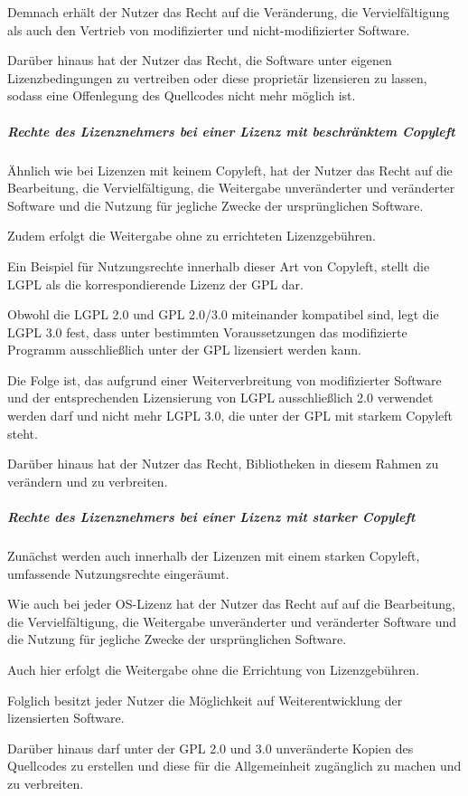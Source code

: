 Demnach erhält der Nutzer das Recht auf die Veränderung, die Vervielfältigung als auch den Vertrieb von modifizierter und nicht-modifizierter Software. 

Darüber hinaus hat der Nutzer das Recht, die Software unter eigenen Lizenzbedingungen zu vertreiben oder diese proprietär lizensieren zu lassen, sodass eine Offenlegung des Quellcodes nicht mehr möglich ist.

\subparagraph{Rechte des Lizenznehmers bei einer Lizenz mit beschränktem Copyleft}
Ähnlich wie bei Lizenzen mit keinem Copyleft, hat der Nutzer das Recht auf die Bearbeitung, die Vervielfältigung, die Weitergabe unveränderter und veränderter Software und die Nutzung für jegliche Zwecke der ursprünglichen Software. 

Zudem erfolgt die Weitergabe ohne zu errichteten Lizenzgebühren.

Ein Beispiel für Nutzungsrechte innerhalb dieser Art von Copyleft, stellt die LGPL als die korrespondierende Lizenz der GPL dar. 

Obwohl die LGPL 2.0 und GPL 2.0/3.0 miteinander kompatibel sind, legt die LGPL 3.0 fest, dass unter bestimmten Voraussetzungen das modifizierte Programm ausschließlich unter der GPL lizensiert werden kann.

Die Folge ist, das aufgrund einer Weiterverbreitung von modifizierter Software und der entsprechenden Lizensierung von LGPL ausschließlich 2.0 verwendet werden darf und nicht mehr LGPL 3.0, die unter der GPL mit starkem Copyleft steht.

Darüber hinaus hat der Nutzer das Recht, Bibliotheken in diesem Rahmen zu verändern und zu verbreiten. 

\subparagraph{Rechte des Lizenznehmers bei einer Lizenz mit starker Copyleft}
Zunächst werden auch innerhalb der Lizenzen mit einem starken Copyleft, umfassende Nutzungsrechte eingeräumt. 

Wie auch bei jeder OS-Lizenz hat der Nutzer das Recht auf auf die Bearbeitung, die Vervielfältigung, die Weitergabe unveränderter und veränderter Software und die Nutzung für jegliche Zwecke der ursprünglichen Software.

Auch hier erfolgt die Weitergabe ohne die Errichtung von Lizenzgebühren.

Folglich besitzt jeder Nutzer die Möglichkeit auf Weiterentwicklung der lizensierten Software.  

Darüber hinaus darf unter der GPL 2.0 und 3.0 unveränderte Kopien des Quellcodes zu erstellen und diese für die Allgemeinheit zugänglich zu machen und zu verbreiten. 

